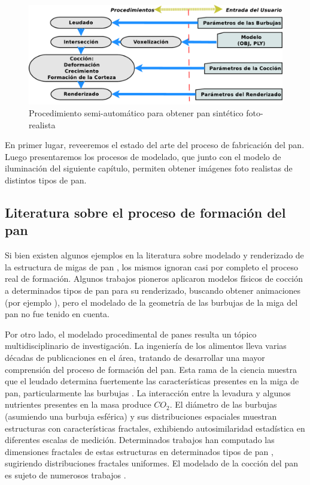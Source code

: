 \begin{figure}
\includegraphics[width=12cm]{figures/pipeline}
\caption{Procedimiento semi-automático para obtener pan sintético foto-realista}
\label{FigPipeline}
\end{figure}


En primer lugar, reveeremos el estado del arte del proceso de fabricación del pan.
Luego presentaremos los procesos de modelado, que junto con el modelo de iluminación del siguiente capítulo, permiten obtener imágenes foto realistas de distintos tipos de pan.

\subsection{Literatura sobre el proceso de formación del pan}
Si bien existen algunos ejemplos en la literatura sobre modelado y renderizado de la estructura de migas de pan \cite{Tong2005,Xenakis2007}, los mismos ignoran casi por completo el proceso real de formación.
Algunos trabajos pioneros aplicaron modelos físicos de cocción a determinados tipos de pan para su renderizado, buscando obtener animaciones (por ejemplo \cite{Rodriguez-Arenas2011}), pero el modelado de la geometría de las burbujas de la miga del pan no fue tenido en cuenta.

Por otro lado, el modelado procedimental de panes resulta un tópico multidisciplinario de investigación.
La ingeniería de los alimentos lleva varias décadas de publicaciones en el área, tratando de desarrollar una mayor comprensión del proceso de formación del pan.
Esta rama de la ciencia muestra que el leudado determina fuertemente las características presentes en la miga de pan, particularmente las burbujas \cite{Babin2006}.
La interacción entre la levadura y algunos nutrientes presentes en la masa produce {\em $CO_{2}$}. 
El diámetro de las burbujas (asumiendo una burbuja esférica) y sus distribuciones espaciales muestran estructuras con características fractales, exhibiendo autosimilaridad estadística en diferentes escalas de medición.
Determinados trabajos han computado las dimensiones fractales de estas estructuras en determinados tipos de pan \cite{Gonzales2008}, sugiriendo distribuciones fractales uniformes.
El modelado de la cocción del pan es sujeto de numerosos trabajos \cite{Mondal2008}.

